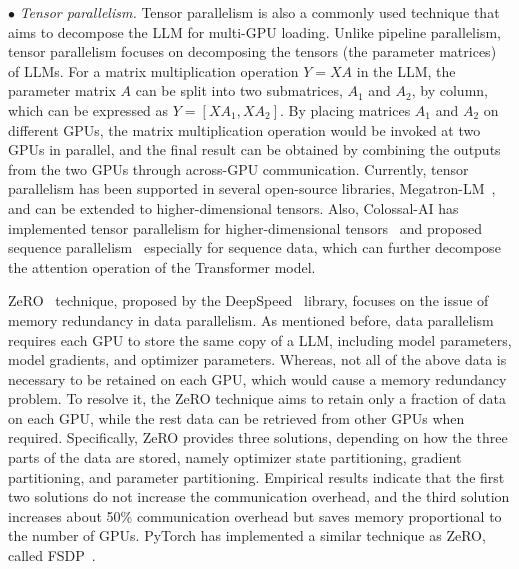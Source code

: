 {$\bullet$ \emph{Tensor parallelism.}
Tensor parallelism is also a commonly used technique that aims to decompose the LLM for multi-GPU loading. 
Unlike pipeline parallelism, tensor parallelism focuses on decomposing the tensors (the parameter matrices) of LLMs.
For a matrix multiplication operation $Y = XA$ in the LLM, the parameter matrix $A$ can be split into two submatrices, $A_1$ and $A_2$, by column, which can be expressed as $Y = [X A_1, X A_2]$.
By placing matrices $A_1$ and $A_2$ on different GPUs, the matrix multiplication operation would be invoked at two GPUs in parallel, and the final result can be obtained by combining the outputs from the two GPUs through across-GPU communication.
Currently, tensor parallelism has been supported in several open-source libraries, \eg Megatron-LM~\cite{Shoeybi-arXiv-2019-Megatron}, and can be extended to higher-dimensional tensors. 
Also, Colossal-AI has  implemented tensor parallelism for higher-dimensional tensors~\cite{Xu-arXiv-2021-An,Wang-ICPP-2022-Tesseract,Bian-arXiv-2021-Maximizing} and proposed sequence parallelism~\cite{Li-arXiv-2021-Sequence}  especially for sequence data, which can further decompose the attention operation of the Transformer model.



ZeRO~\cite{Rajbhandari-IEEE-2020-ZeRO} technique, proposed by the DeepSpeed~\cite{Rasley-KDD-2020-DeepSpeed}
library, focuses on the issue of memory redundancy in data parallelism.
As mentioned before, data parallelism requires each GPU to store the same copy of a LLM, including model parameters, model gradients, and optimizer parameters.
Whereas, not all of the above data is necessary to be retained on each GPU, which would cause a memory redundancy problem.
To resolve it, the ZeRO technique aims to retain only a fraction of data on each GPU, while the rest data can be retrieved from other GPUs when required.
Specifically, ZeRO provides three solutions, depending on how the three parts of the data are stored,
{
namely optimizer state partitioning, gradient partitioning, and parameter partitioning.
}
Empirical results indicate that the first two solutions do not increase the communication overhead, and the third solution increases about 50\% communication overhead but saves memory proportional to the number of GPUs.
PyTorch has implemented a similar technique as ZeRO, called FSDP~\cite{FairScale2021}.


}
